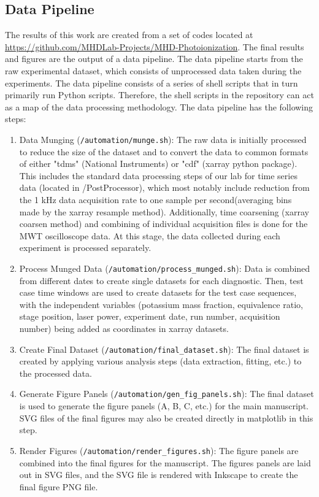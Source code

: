 \clearpage

\subsection{Data Pipeline}

The results of this work are created from a set of codes located at \url{https://github.com/MHDLab-Projects/MHD-Photoionization}. The final results and figures are the output of a data pipeline.  The data pipeline starts from the raw experimental dataset, which consists of unprocessed data taken during the experiments. The data pipeline consists of a series of shell scripts that in turn primarily run Python scripts. Therefore, the shell scripts in the repository can act as a map of the data processing methodology. The data pipeline has the following steps: 

\begin{enumerate}
    \item Data Munging (\texttt{/automation/munge.sh}): The raw data is initially processed to reduce the size of the dataset and to convert the data to common formats of either "tdms" (National Instruments) or "cdf" (xarray python package). This includes the standard data processing steps of our lab for time series data (located in /PostProcessor), which most notably include reduction from the 1 kHz data acquisition rate to one sample per second(averaging bins made by the xarray resample method). Additionally, time coarsening (xarray coarsen method) and combining of individual acquisition files is done for the MWT oscilloscope data.  At this stage, the data collected during each experiment is processed separately.
    \item Process Munged Data (\texttt{/automation/process\_munged.sh}): Data is combined from different dates to create single datasets for each diagnostic. Then, test case time windows are used to create datasets for the test case sequences, with the independent variables (potassium mass fraction, equivalence ratio, stage position, laser power, experiment date, run number, acquisition number) being added as coordinates in xarray datasets.
    \item Create Final Dataset (\texttt{/automation/final\_dataset.sh}): The final dataset is created by applying various analysis steps (data extraction, fitting, etc.) to the processed data. 
    \item Generate Figure Panels (\texttt{/automation/gen\_fig\_panels.sh}): The final dataset is used to generate the figure panels (A, B, C, etc.) for the main manuscript. SVG files of the final figures may also be created directly in matplotlib in this step. 
    \item Render Figures (\texttt{/automation/render\_figures.sh}): The figure panels are combined into the final figures for the manuscript. The figures panels are laid out in SVG files, and the SVG file is rendered with Inkscape to create the final figure PNG file. 
\end{enumerate}


